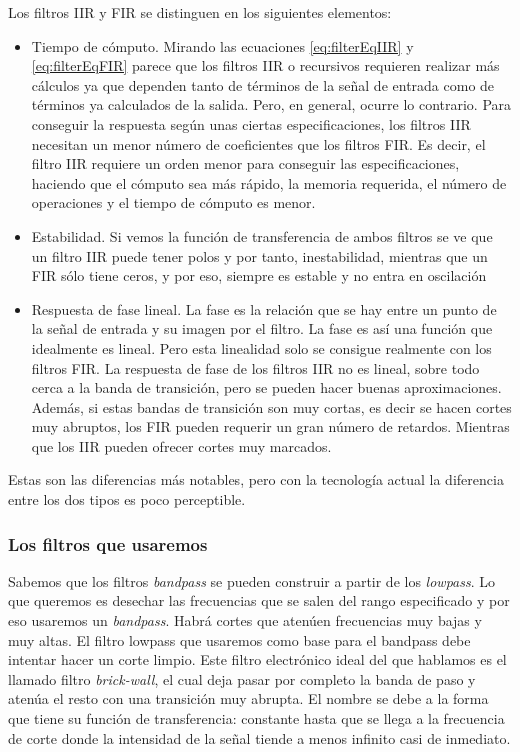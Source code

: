 Los filtros IIR y FIR se distinguen en los siguientes elementos:
\begin{itemize}
\item Tiempo de cómputo. Mirando las ecuaciones \ref{eq:filterEqIIR} y \ref{eq:filterEqFIR} %
parece que los filtros IIR o recursivos requieren realizar más cálculos ya que dependen tanto de términos de la señal de entrada como de términos ya calculados de la salida. Pero, en general, ocurre lo contrario. Para conseguir la respuesta según unas ciertas especificaciones, los filtros IIR necesitan un menor número de coeficientes que los filtros FIR. Es decir, el filtro IIR requiere un orden menor para conseguir las especificaciones, haciendo que el cómputo sea más rápido, la memoria requerida, el número de operaciones y el tiempo de cómputo es menor.
\item Estabilidad. Si vemos la función de transferencia de ambos filtros se ve que un filtro IIR puede tener polos y por tanto, inestabilidad, mientras que un FIR sólo tiene ceros, y por eso, siempre es estable y no entra en oscilación
\item Respuesta de fase lineal. La fase es la relación que se hay entre un punto de la señal de entrada y su imagen por el filtro. La fase es así una función que idealmente es lineal. Pero esta linealidad solo se consigue realmente con los filtros FIR. La respuesta de fase de los filtros IIR no es lineal, sobre todo cerca a la banda de transición, pero se pueden hacer buenas aproximaciones. Además, si estas bandas de transición son muy cortas, es decir se hacen cortes muy abruptos, los FIR pueden requerir un gran número de retardos. Mientras que los IIR pueden ofrecer cortes muy marcados. 
\end{itemize}

Estas son las diferencias más notables, pero con la tecnología actual la diferencia entre los dos tipos es poco perceptible.


\subsubsection{Los filtros que usaremos} %

Sabemos que los filtros \emph{bandpass} se pueden construir a partir de los \emph{lowpass}. Lo que queremos es desechar las frecuencias que se salen del rango especificado y por eso usaremos un \emph{bandpass}. Habrá cortes que atenúen frecuencias muy bajas y muy altas. El filtro lowpass que usaremos como base para el bandpass debe intentar hacer un corte limpio. Este filtro electrónico ideal del que hablamos es el llamado filtro \emph{brick-wall}, el cual deja pasar por completo la banda de paso y atenúa el resto con una transición muy abrupta. El nombre se debe a la forma que tiene su función de transferencia: constante hasta que se llega a la frecuencia de corte donde la intensidad de la señal tiende a menos infinito casi de inmediato. 

